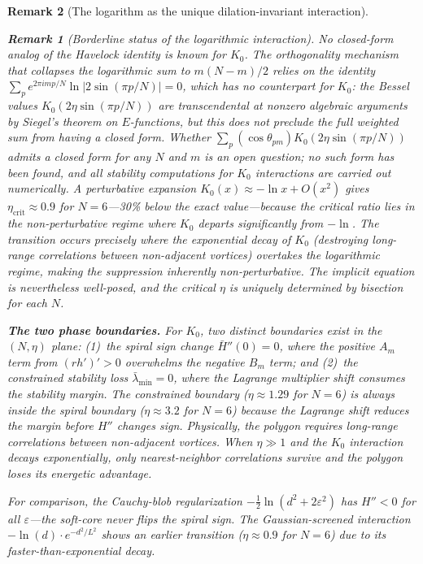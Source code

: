 \documentclass[12pt, a4paper]{article}
\newtheorem{remark}{Remark}[section]
\numberwithin{equation}{section}
\begin{document}
\begin{remark}[The logarithm as the unique dilation-invariant interaction]
\begin{remark}[Borderline status of the logarithmic interaction]
No closed-form analog of the Havelock identity is known for $K_0$.
The orthogonality mechanism that collapses the logarithmic sum to
$m(N{-}m)/2$ relies on the identity $\sum_p e^{2\pi i mp/N}\ln
|2\sin(\pi p/N)| = 0$, which has no counterpart for $K_0$:
the Bessel values $K_0(2\eta\sin(\pi p/N))$ are transcendental at
nonzero algebraic arguments by Siegel's theorem on $E$-functions,
but this does not preclude the full weighted sum from having a
closed form.  Whether $\sum_p (\cos\theta_{pm})
K_0(2\eta\sin(\pi p/N))$ admits a closed form for any $N$ and $m$
is an open question; no such form has been found, and all stability
computations for $K_0$ interactions are carried out numerically.
A perturbative expansion
$K_0(x) \approx -\ln x + O(x^2)$ gives $\eta_{\mathrm{crit}} \approx
0.9$ for $N = 6$---30\% below the exact value---because the critical
ratio lies in the non-perturbative regime where $K_0$ departs
significantly from $-\ln$.  The transition occurs precisely where the
exponential decay of $K_0$ (destroying long-range correlations between
non-adjacent vortices) overtakes the logarithmic regime, making the
suppression inherently non-perturbative.  The implicit equation is
nevertheless well-posed, and the critical $\eta$ is uniquely determined
by bisection for each $N$.

\medskip\noindent\textbf{The two phase boundaries.}
For $K_0$, two distinct boundaries exist in the $(N, \eta)$ plane:
(1)~the \emph{spiral sign change} $\bar H''(0) = 0$, where the
positive $A_m$ term from $(rh')' > 0$ overwhelms the negative $B_m$
term; and (2)~the \emph{constrained stability loss}
$\bar\lambda_{\min} = 0$, where the Lagrange multiplier shift
consumes the stability margin.  The constrained boundary
($\eta \approx 1.29$ for $N = 6$) is always \emph{inside} the
spiral boundary ($\eta \approx 3.2$ for $N = 6$) because the
Lagrange shift reduces the margin before $H''$ changes sign.
Physically, the polygon requires long-range correlations between
non-adjacent vortices.  When $\eta \gg 1$ and the $K_0$ interaction
decays exponentially, only nearest-neighbor correlations survive and
the polygon loses its energetic advantage.

For comparison, the Cauchy-blob regularization
$-\tfrac12\ln(d^2 + 2\varepsilon^2)$ has $H'' < 0$ for \emph{all}
$\varepsilon$---the soft-core never flips the spiral sign.  The
Gaussian-screened interaction $-\ln(d)\cdot e^{-d^2/L^2}$
shows an earlier transition ($\eta \approx 0.9$ for $N = 6$) due to
its faster-than-exponential decay.


\end{remark}
\end{remark}
\end{document}
